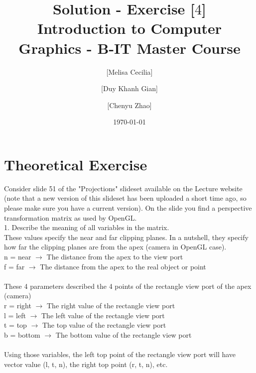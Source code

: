 \documentclass[10pt,a4paper]{article}
\begin{document}
\title{Solution - Exercise [$4$]\\
\small{Introduction to Computer Graphics - B-IT Master Course}}
\author{ [Melisa Cecilia] \and [Duy Khanh Gian] \and [Chenyu Zhao]}
\date{\today}
\maketitle

\section*{Theoretical Exercise}
Consider slide 51 of the "Projections" slideset available on the Lecture website (note that a new version of this slideset has been uploaded a short time ago, so please make sure you have a current version). On the slide you find a perspective transformation matrix as used by OpenGL.\\

1. Describe the meaning of all variables in the matrix. \\

These values specify the near and far clipping planes. In a nutshell, they specify how far the clipping planes are from the apex (camera in OpenGL case). \\
n = near $\rightarrow$ The distance from the apex to the view port \\
f = far $\rightarrow$ The distance from the apex to the real object or point \\ \\

These 4 parameters described the 4 points of the rectangle view port of the apex (camera) \\
r = right $\rightarrow$ The right value of the rectangle view port \\
l = left $\rightarrow$ The left value of the rectangle view port \\
t = top $\rightarrow$ The top value of the rectangle view port \\
b = bottom $\rightarrow$ The bottom value of the rectangle view port \\ \\

Using those variables, the left top point of the rectangle view port will have vector value (l, t, n), the right top point (r, t, n), etc. \\ \\
\end{document}
